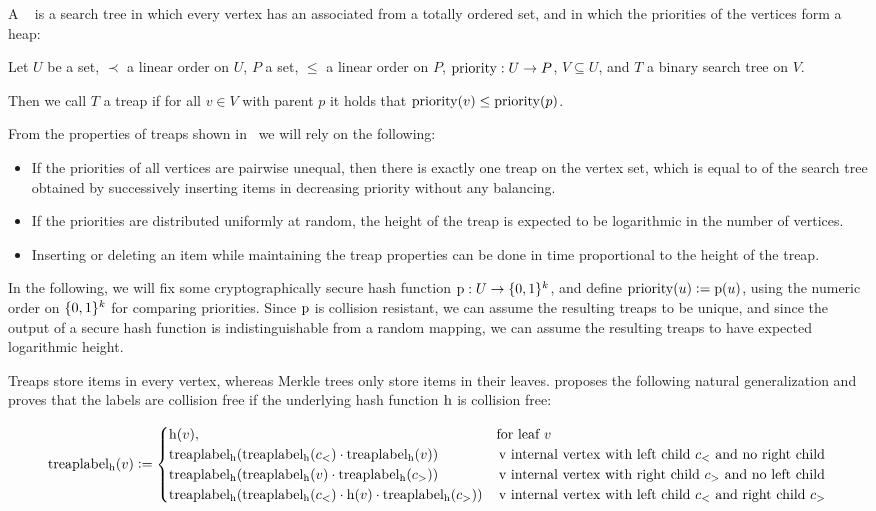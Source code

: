 A ~\cite{seidel1996randomized} is a search tree in which every vertex has an associated  from a totally ordered set, and in which the priorities of the vertices form a heap:

\begin{definition}
Let $U$ be a set, $\prec$ a linear order on $U$, $P$ a set, $\leq$ a linear order on $P$, ${\operatorname{priority}}: {U} \rightarrow {P}$, $V \subseteq U$, and $T$ a binary search tree on $V$.

Then we call $T$ a treap if for all $v \in V$ with parent $p$ it holds that $\operatorname{priority}(v) \leq \operatorname{priority}(p)$.
\end{definition}

From the properties of treaps shown in~\cite{seidel1996randomized} we will rely on the following:

\begin{itemize}
  \item If the priorities of all vertices are pairwise unequal, then there is exactly one treap on the vertex set, which is equal to of the search tree obtained by successively inserting items in decreasing priority without any balancing.
  \item If the priorities are distributed uniformly at random, the height of the treap is expected to be logarithmic in the number of vertices.
  \item Inserting or deleting an item while maintaining the treap properties can be done in time proportional to the height of the treap.
\end{itemize}

In the following, we will fix some cryptographically secure hash function ${\operatorname{p}}: {U} \rightarrow {\{0, 1\}^k}$, and define $\operatorname{priority}(u) \vcentcolon= \operatorname{p}(u)$, using the numeric order on $\{0, 1\}^k$ for comparing priorities. Since $\operatorname{p}$ is collision resistant, we can assume the resulting treaps to be unique, and since the output of a secure hash function is indistinguishable from a random mapping, we can assume the resulting treaps to have expected logarithmic height.

Treaps store items in every vertex, whereas Merkle trees only store items in their leaves. \cite{buldas2002eliminating} proposes the following natural generalization and proves that the labels are collision free if the underlying hash function $\operatorname{h}$ is collision free:

  \[
   \operatorname{treaplabel_{\operatorname{h}}}(v) \vcentcolon= \begin{cases}
\operatorname{h}(v), &  \text{for leaf $v$} \\
\operatorname{treaplabel_{\operatorname{h}}}(\operatorname{treaplabel_{\operatorname{h}}}(c_{<}) \cdot \operatorname{treaplabel_{\operatorname{h}}}(v)) & \, \text{v internal vertex with left child $c_{<}$ and no right child}\\
\operatorname{treaplabel_{\operatorname{h}}}(\operatorname{treaplabel_{\operatorname{h}}}(v) \cdot \operatorname{treaplabel_{\operatorname{h}}}(c_{>})) & \, \text{v internal vertex with right child $c_{>}$ and no left child}\\
\operatorname{treaplabel_{\operatorname{h}}}(\operatorname{treaplabel_{\operatorname{h}}}(c_{<}) \cdot \operatorname{h}(v) \cdot \operatorname{treaplabel_{\operatorname{h}}}(c_{>})) & \, \text{v internal vertex with left child $c_{<}$ and right child $c_{>}$}
\end{cases}
  \]

